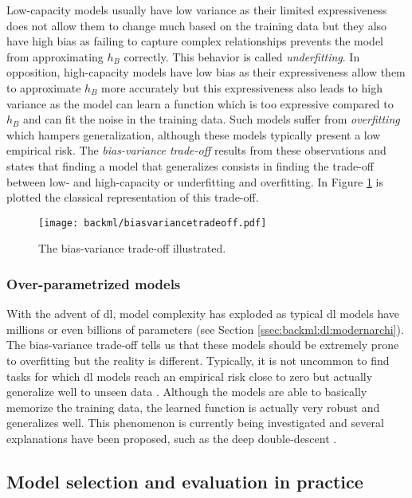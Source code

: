 Low-capacity models usually have low variance as their limited expressiveness does
not allow them to change much based on the training data but they also have high
bias as failing to capture complex relationships prevents the model from approximating
$h_B$ correctly. This behavior is called \textit{underfitting}. In opposition,
high-capacity models have low bias as their expressiveness allow them to approximate
$h_B$ more accurately but this expressiveness also leads to high variance as the
model can learn a function which is too expressive compared to $h_B$ and can fit
the noise in the training data. Such models suffer from \textit{overfitting} which
hampers generalization, although these models typically present a low empirical
risk. The \textit{bias-variance trade-off} results from these observations and
states that finding a model that generalizes consists in finding the trade-off
between low- and high-capacity or underfitting and overfitting. In Figure
\ref{fig:backml:biasvariancetradeoff} is plotted the classical representation of
this trade-off.

\begin{figure}
  \centering
  \texttt{[image: backml/biasvariancetradeoff.pdf]}
  \caption{The bias-variance trade-off illustrated.}
  \label{fig:backml:biasvariancetradeoff}
\end{figure}

\subsubsection{Over-parametrized models}
\label{sssec:backml:overparam}

With the advent of \acrlong{dl}, model complexity has exploded as typical \acrlong{dl}
models have millions or even billions of parameters (see Section
\ref{ssec:backml:dl:modernarchi}). The bias-variance trade-off tells us that these
models should be extremely prone to overfitting but the reality is different.
Typically, it is not uncommon to find tasks for which \acrlong{dl} models reach
an empirical risk close to zero but actually generalize well to unseen data
\cite{zhang2021understanding}. Although the models are able to basically
memorize the training data, the learned function is actually very robust and
generalizes well. This phenomenon is currently being investigated and several
explanations have been proposed, such as the deep double-descent
\cite{belkin2019reconciling}.

\subsection{Model selection and evaluation in practice}
\label{ssec:backml:modelselinpractice}

